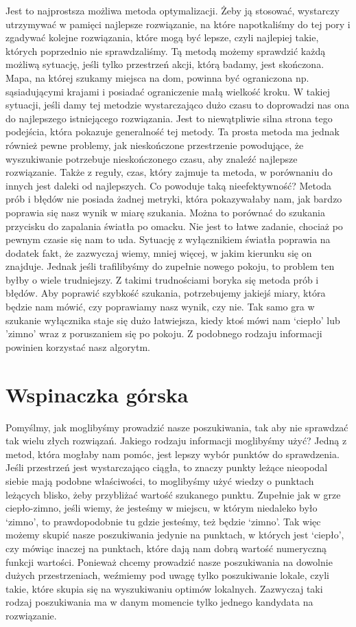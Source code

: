 Jest to najprostsza możliwa metoda optymalizacji. Żeby ją stosować, wystarczy utrzymywać w pamięci najlepsze rozwiązanie, na które napotkaliśmy do tej pory i zgadywać kolejne rozwiązania, które mogą być lepsze, czyli najlepiej takie, których poprzednio nie sprawdzaliśmy. Tą metodą możemy sprawdzić każdą możliwą sytuację, jeśli tylko przestrzeń akcji, którą badamy, jest skończona. Mapa, na której szukamy miejsca na dom, powinna być ograniczona np. sąsiadującymi krajami i posiadać ograniczenie małą wielkość kroku. W takiej sytuacji, jeśli damy tej metodzie wystarczająco dużo czasu to doprowadzi nas ona do najlepszego istniejącego rozwiązania. Jest to niewątpliwie silna strona tego podejścia, która pokazuje generalność tej metody. Ta prosta metoda ma jednak również pewne problemy, jak nieskończone przestrzenie powodujące, że wyszukiwanie potrzebuje nieskończonego czasu, aby znaleźć najlepsze rozwiązanie. Także z reguły, czas, który zajmuje ta metoda, w porównaniu do innych jest daleki od najlepszych. Co powoduje taką nieefektywność? Metoda prób i błędów nie posiada żadnej metryki, która pokazywałaby nam, jak bardzo poprawia się nasz wynik w miarę szukania. Można to porównać do szukania przycisku do zapalania światła po omacku. Nie jest to łatwe zadanie, chociaż po pewnym czasie się nam to uda. Sytuację z wyłącznikiem światła poprawia na dodatek fakt, że zazwyczaj wiemy, mniej więcej, w jakim kierunku się on znajduje. Jednak jeśli trafilibyśmy do zupełnie nowego pokoju, to problem ten byłby o wiele trudniejszy. Z takimi trudnościami boryka się metoda prób i błędów. Aby poprawić szybkość szukania, potrzebujemy jakiejś miary, która będzie nam mówić, czy poprawiamy nasz wynik, czy nie. Tak samo gra w szukanie wyłącznika staje się dużo łatwiejsza, kiedy ktoś mówi nam ‘ciepło’ lub ’zimno’ wraz z poruszaniem się po pokoju. Z podobnego rodzaju informacji powinien korzystać nasz algorytm.\newline

\section{Wspinaczka górska}

Pomyślmy, jak moglibyśmy prowadzić nasze poszukiwania, tak aby nie sprawdzać tak wielu złych rozwiązań. Jakiego rodzaju informacji moglibyśmy użyć? Jedną z metod, która mogłaby nam pomóc, jest lepszy wybór punktów do sprawdzenia. Jeśli przestrzeń jest wystarczająco ciągła, to znaczy punkty leżące nieopodal siebie mają podobne właściwości, to moglibyśmy użyć wiedzy o punktach leżących blisko, żeby przybliżać wartość szukanego punktu. Zupełnie jak w grze ciepło-zimno, jeśli wiemy, że jesteśmy w miejscu, w którym niedaleko było ‘zimno’, to prawdopodobnie tu gdzie jesteśmy, też będzie ‘zimno’. Tak więc możemy skupić nasze poszukiwania jedynie na punktach, w których jest ‘ciepło’, czy mówiąc inaczej na punktach, które dają nam dobrą wartość numeryczną funkcji wartości. Ponieważ chcemy prowadzić nasze poszukiwania na dowolnie dużych przestrzeniach, weźmiemy pod uwagę tylko poszukiwanie lokale, czyli takie, które skupia się na wyszukiwaniu optimów lokalnych. Zazwyczaj taki rodzaj poszukiwania ma w danym momencie tylko jednego kandydata na rozwiązanie.\newline


